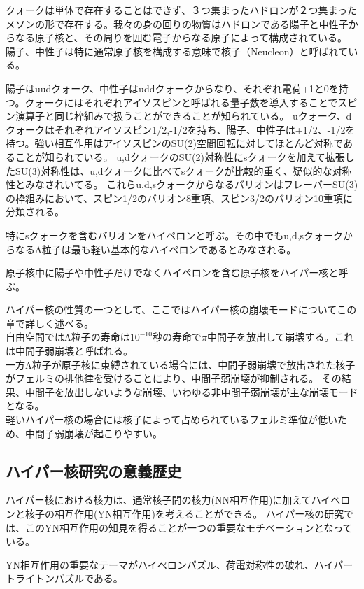 \documentclass[a4paper,11pt,uplatex]{jsbook}
\begin{document}
クォークは単体で存在することはできず、３つ集まったハドロンが２つ集まったメソンの形で存在する。我々の身の回りの物質はハドロンである陽子と中性子からなる原子核と、その周りを囲む電子からなる原子によって構成されている。
陽子、中性子は特に通常原子核を構成する意味で核子（Neucleon）と呼ばれている。

陽子はuudクォーク、中性子はuddクォークからなり、それぞれ電荷+1と0を持つ。クォークにはそれぞれアイソスピンと呼ばれる量子数を導入することでスピン演算子と同じ枠組みで扱うことができることが知られている。
uクォーク、dクォークはそれぞれアイソスピン1/2,-1/2を持ち、陽子、中性子は+1/2、-1/2を持つ。強い相互作用はアイソスピンのSU(2)空間回転に対してほとんど対称であることが知られている。
u,dクォークのSU(2)対称性にsクォークを加えて拡張したSU(3)対称性は、u,dクォークに比べてsクォークが比較的重く、疑似的な対称性とみなされいてる。
これらu,d,sクォークからなるバリオンはフレーバーSU(3)の枠組みにおいて、スピン1/2のバリオン8重項、スピン3/2のバリオン10重項に分類される。

特にsクォークを含むバリオンをハイペロンと呼ぶ。その中でもu,d,sクォークからなるΛ粒子は最も軽い基本的なハイペロンであるとみなされる。

原子核中に陽子や中性子だけでなくハイペロンを含む原子核をハイパー核と呼ぶ。

ハイパー核の性質の一つとして、ここではハイパー核の崩壊モードについてこの章で詳しく述べる。\\
自由空間ではΛ粒子の寿命は$10^{-10}$秒の寿命で$\pi$中間子を放出して崩壊する。これは中間子弱崩壊と呼ばれる。\\
一方Λ粒子が原子核に束縛されている場合には、中間子弱崩壊で放出された核子がフェルミの排他律を受けることにより、中間子弱崩壊が抑制される。
その結果、中間子を放出しないような崩壊、いわゆる非中間子弱崩壊が主な崩壊モードとなる。\\
軽いハイパー核の場合には核子によって占められているフェルミ準位が低いため、中間子弱崩壊が起こりやすい。\\

\subsection{ハイパー核研究の意義歴史}
ハイパー核における核力は、通常核子間の核力(NN相互作用)に加えてハイペロンと核子の相互作用(YN相互作用)を考えることができる。
ハイパー核の研究では、このYN相互作用の知見を得ることが一つの重要なモチベーションとなっている。

YN相互作用の重要なテーマがハイペロンパズル、荷電対称性の破れ、ハイパートライトンパズルである。
\end{document}
